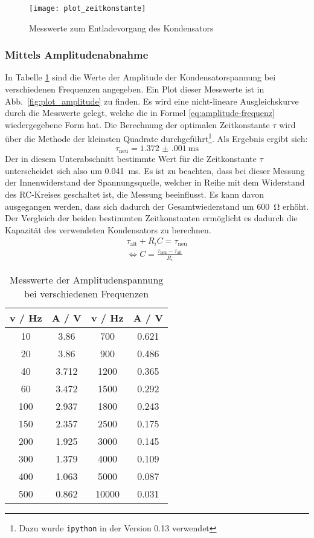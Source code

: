 \begin{figure}
\centering
\texttt{[image: plot\_zeitkonstante]}
\caption{Messwerte zum Entladevorgang des Kondensators}
\label{fig:zur_zeitkonstante}
\end{figure}

\subsubsection{Mittels Amplitudenabnahme}
In Tabelle \ref{tab:messwerte_amplituden} sind die Werte der Amplitude
der Kondensatorspannung bei verschiedenen Frequenzen angegeben. Ein Plot
dieser Messwerte ist in Abb.~\ref{fig:plot_amplitude} zu finden. Es wird eine
nicht-lineare Ausgleichskurve durch die Messwerte gelegt, welche die in
Formel \eqref{eq:amplitude-frequenz} wiedergegebene Form hat. Die
Berechnung der optimalen Zeitkonstante $\tau$ wird über die Methode der
kleinsten Quadrate durchgeführt\footnote{Dazu wurde \texttt{ipython}
 in der Version 0.13  verwendet}. Als Ergebnis ergibt sich:
%
\begin{equation}
\tau_\text{neu} = \SI{1.372(001)}{\milli\second}
\end{equation}
%
Der in diesem Unterabschnitt bestimmte Wert für die Zeitkonstante $\tau$ unterscheidet sich also um \SI{0.041}{\milli\second}. Es ist zu beachten, dass bei dieser Messung der Innenwiderstand der Spannungsquelle, welcher in Reihe mit dem Widerstand des RC-Kreises geschaltet ist, die Messung beeinflusst. Es kann davon ausgegangen werden, dass sich dadurch der Gesamtwiederstand um \SI{600}{\ohm} erhöht. Der Vergleich der beiden bestimmten Zeitkonstanten ermöglicht es dadurch die Kapazität des verwendeten Kondensators zu berechnen.
\begin{equation*}
  \begin{split}
    \tau_\text{alt} + R_i C = \tau_\text{neu}\\
	\Leftrightarrow C = \frac{\tau_\text{neu} - \tau_\text{alt}}{R_i}
  \end{split}
\end{equation*}
\begin{table}
  \centering
  \begin{tabular}{c|c|c|c}
    \toprule
    v / Hz & A / V & v / Hz & A / V \\
    \midrule
     10 &3.86 &700 &0.621 \\
     20 & 3.86 &900 &0.486 \\
     40 &3.712 &1200& 0.365 \\
     60 &3.472 &1500& 0.292 \\
    100& 2.937 &1800& 0.243 \\
    150& 2.357 &2500& 0.175 \\
    200& 1.925 &3000& 0.145 \\
    300& 1.379 &4000& 0.109 \\
    400& 1.063 &5000& 0.087 \\
    500& 0.862 &10000& 0.031 \\ 
 \bottomrule
  \end{tabular}
  \caption{Messwerte der Amplitudenspannung bei verschiedenen Frequenzen}
  \label{tab:messwerte_amplituden}
\end{table}
